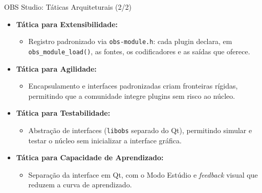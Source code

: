 \documentclass[aspectratio=169]{beamer}
\begin{document}
\begin{frame}{OBS Studio: Táticas Arquiteturais (2/2)}
\begin{itemize}\setlength{\itemsep}{0.55em}
\item \textbf{Tática para Extensibilidade:}
  \begin{itemize}
  \item Registro padronizado via \texttt{obs-module.h}: cada plugin declara, em \texttt{obs\_module\_load()}, as fontes, os codificadores e as saídas que oferece.
  \end{itemize}
\item \textbf{Tática para Agilidade:}
  \begin{itemize}
  \item Encapsulamento e interfaces padronizadas criam fronteiras rígidas, permitindo que a comunidade integre plugins sem risco ao núcleo.
  \end{itemize}
\item \textbf{Tática para Testabilidade:}
  \begin{itemize}
  \item Abstração de interfaces (\texttt{libobs} separado do Qt), permitindo simular e testar o núcleo sem inicializar a interface gráfica.
  \end{itemize}
\item \textbf{Tática para Capacidade de Aprendizado:}
  \begin{itemize}
  \item Separação da interface em Qt, com o Modo Estúdio e \textit{feedback} visual que reduzem a curva de aprendizado.
  \end{itemize}
\end{itemize}
\end{frame}

\end{document}
